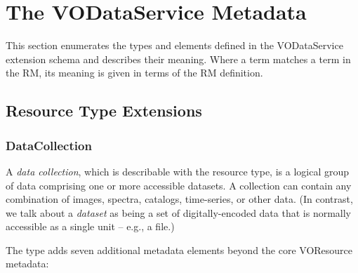 \documentclass[11pt,a4paper]{ivoa}
\begin{document}
\section{The VODataService Metadata}
\label{sect:metadata}


This section enumerates the types and elements defined in the
VODataService extension schema and describes their meaning.  Where a
term matches a term in the RM, its meaning is given
in terms of the RM definition.  


\subsection{Resource Type Extensions}
\label{sect:resext}

\subsubsection{DataCollection}
\label{sect:datacollection}


A \emph{data collection}, which is describable with the
 resource type, is a logical
group of data comprising one or more accessible
datasets.  A collection can contain any combination of images,
spectra, catalogs, time-series, or other data.  (In contrast, we talk
about a \emph{dataset} as being a set of digitally-encoded
data that is normally accessible as a single unit -- e.g., a file.)



The  type adds seven additional metadata
elements beyond the core VOResource metadata:
\end{document}
